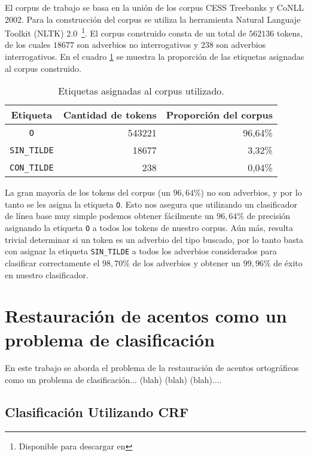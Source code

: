 \documentclass[runningheads,a4paper]{llncs}
\begin{document}
El corpus de trabajo se basa en la unión de los corpus CESS Treebanks y CoNLL 2002. Para la construcción del corpus se utiliza la herramienta Natural Languaje Toolkit (NLTK) 2.0~\footnote{Disponible para descargar en \nltk}. El corpus construido consta de un total de $562136$ tokens, de los cuales $18677$ son adverbios no interrogativos y $238$ son adverbios interrogativos. En el cuadro \ref{table:corpus} se muestra la proporci\'on de las etiquetas asignadas al corpus construido.

\begin{table}[ht]
 	\renewcommand{\arraystretch}{1.3}
	\renewcommand{\tabcolsep}{3pt}
	\caption{Etiquetas asignadas al corpus utilizado.}
	\label{table:corpus}
	\centering
	\begin{tabular}{c r r}
		\hline\hline
		\multicolumn{1}{c}{\textbf{Etiqueta}} & \multicolumn{1}{c}{\textbf{Cantidad de tokens}} & \multicolumn{1}{c}{\textbf{Proporci\'on del corpus}} \\
		\hline
		\texttt{O} & 543221 & 96,64\% \\
		\texttt{SIN\_TILDE} & 18677 & 3,32\% \\
		\texttt{CON\_TILDE} & 238 & 0,04\% \\
		\hline
	\end{tabular}
\end{table}

La gran mayoría de los tokens del corpus (un $96,64\%$)  no son adverbios, y por lo tanto se les asigna la etiqueta \texttt{\small O}. Esto nos asegura que utilizando un clasificador de línea base muy simple podemos obtener fácilmente un $96,64\%$ de precisión asignando la etiqueta \texttt{\small O} a todos los tokens de nuestro corpus. A\'un m\'as, resulta trivial determinar si un token es un adverbio del tipo buscado, por lo tanto basta con asignar la etiqueta \texttt{\small SIN\_TILDE} a todos los adverbios considerados para clasificar correctamente el $98,70\%$ de los adverbios y obtener un $99,96\%$ de \'exito en nuestro clasificador.

\section{Restauración de acentos como un problema de clasificación}
\label{sec:solucion-propuesta}

En este trabajo se aborda el problema de la restauraci\'on de acentos ortogr\'aficos como un problema de clasificaci\'on... (blah) (blah) (blah)....

\subsection{Clasificación Utilizando CRF}
\label{sec:CRF}
\end{document}
